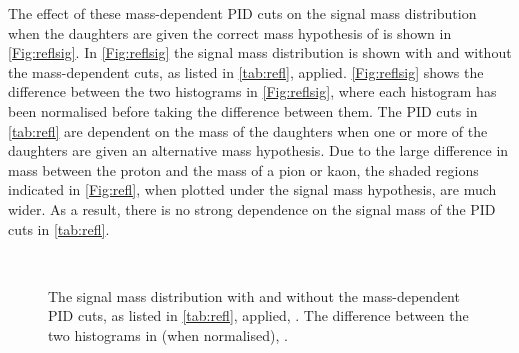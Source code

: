 The effect of these mass-dependent PID cuts on the signal mass distribution when the daughters are given the correct mass hypothesis of \proton\pim\mumu is shown in \autoref{Fig:reflsig}. In \autoref{Fig:reflsig}\protect{} the signal mass distribution is shown with and without the mass-dependent cuts, as listed in \autoref{tab:refl}, applied. \autoref{Fig:reflsig}\protect{} shows the difference between the two histograms in \autoref{Fig:reflsig}\protect{}, where each histogram has been normalised before taking the difference between them. The PID cuts in \autoref{tab:refl} are dependent on the mass of the daughters when one or more of the daughters are given an alternative mass hypothesis. Due to the large difference in mass between the proton and the mass of a pion or kaon, the shaded regions indicated in \autoref{Fig:refl}\protect{}, when plotted under the signal mass hypothesis, are much wider. As a result, there is no strong dependence on the signal mass of the PID cuts in \autoref{tab:refl}. 
\begin{figure}[h!]
  \def\nh{0.7\textwidth}
  \centering
    \textwidth\\
  \textwidth
  \caption{The signal mass distribution with and without the mass-dependent PID cuts, as listed in \autoref{tab:refl}\protect{}, applied, \protect{}. The difference between the two histograms in \protect{} (when normalised), \protect{}.} 
  \label{Fig:reflsig}
\end{figure}

